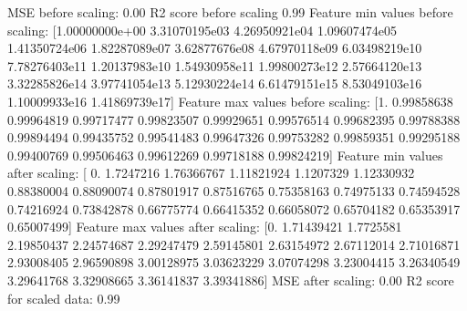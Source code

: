 \documentclass[letterpaper,10pt,english]{sphinxmanual}
\begin{document}
\begin{sphinxVerbatim}[commandchars=\\\{\}]
   


 
\end{sphinxVerbatim}

\begin{sphinxVerbatim}[commandchars=\\\{\}]
MSE before scaling: 0.00
R2 score before scaling 0.99
Feature min values before scaling:
 [1.00000000e+00 3.31070195e\PYGZhy{}03 4.26950921e\PYGZhy{}04 1.09607474e\PYGZhy{}05
 1.41350724e\PYGZhy{}06 1.82287089e\PYGZhy{}07 3.62877676e\PYGZhy{}08 4.67970118e\PYGZhy{}09
 6.03498219e\PYGZhy{}10 7.78276403e\PYGZhy{}11 1.20137983e\PYGZhy{}10 1.54930958e\PYGZhy{}11
 1.99800273e\PYGZhy{}12 2.57664120e\PYGZhy{}13 3.32285826e\PYGZhy{}14 3.97741054e\PYGZhy{}13
 5.12930224e\PYGZhy{}14 6.61479151e\PYGZhy{}15 8.53049103e\PYGZhy{}16 1.10009933e\PYGZhy{}16
 1.41869739e\PYGZhy{}17]
Feature max values before scaling:
 [1.         0.99858638 0.99964819 0.99717477 0.99823507 0.99929651
 0.99576514 0.99682395 0.99788388 0.99894494 0.99435752 0.99541483
 0.99647326 0.99753282 0.99859351 0.99295188 0.99400769 0.99506463
 0.99612269 0.99718188 0.99824219]
Feature min values after scaling:
 [ 0.         \PYGZhy{}1.7247216  \PYGZhy{}1.76366767 \PYGZhy{}1.11821924 \PYGZhy{}1.1207329  \PYGZhy{}1.12330932
 \PYGZhy{}0.88380004 \PYGZhy{}0.88090074 \PYGZhy{}0.87801917 \PYGZhy{}0.87516765 \PYGZhy{}0.75358163 \PYGZhy{}0.74975133
 \PYGZhy{}0.74594528 \PYGZhy{}0.74216924 \PYGZhy{}0.73842878 \PYGZhy{}0.66775774 \PYGZhy{}0.66415352 \PYGZhy{}0.66058072
 \PYGZhy{}0.65704182 \PYGZhy{}0.65353917 \PYGZhy{}0.65007499]
Feature max values after scaling:
 [0.         1.71439421 1.7725581  2.19850437 2.24574687 2.29247479
 2.59145801 2.63154972 2.67112014 2.71016871 2.93008405 2.96590898
 3.00128975 3.03623229 3.07074298 3.23004415 3.26340549 3.29641768
 3.32908665 3.36141837 3.39341886]
MSE after  scaling: 0.00
R2 score for  scaled data: 0.99
\end{sphinxVerbatim}
\end{document}
